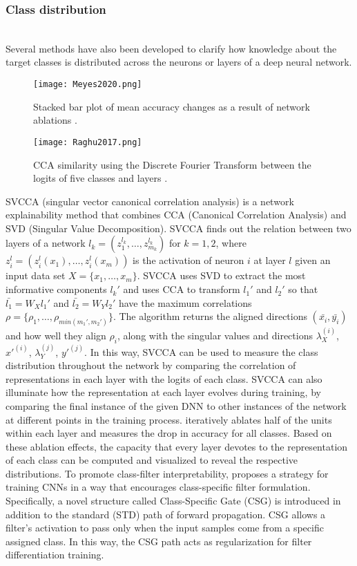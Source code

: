 \documentclass[journal]{IEEEtran}
\begin{document}
\subsubsection{Class distribution}
\hfill\\
Several methods have also been developed to clarify how knowledge about the target classes is distributed across the neurons or layers of a deep neural network.

\begin{figure}
  \texttt{[image: Meyes2020.png]}
  \caption{Stacked bar plot of mean accuracy changes as a result of network ablations \cite{Meyes2020}.}
\end{figure}

\begin{figure}
  \texttt{[image: Raghu2017.png]}
  \caption{CCA similarity using the Discrete Fourier Transform between the logits of five classes and layers \cite{Raghu2017}.}
\end{figure}

SVCCA (singular vector canonical correlation analysis) \cite{Raghu2017} is a network explainability method that combines CCA (Canonical Correlation Analysis) and SVD (Singular Value Decomposition). SVCCA finds out the relation between two layers of a network $l_k=(z_1^{l_k},…,z_{m_k}^{l_k})$ for $k = 1,2$, where $z_i^l=(z_i^l (x_1 ),…,z_i^l (x_m ))$ is the activation of neuron $i$ at layer $l$ given an input data set $X=\{x_1,…,x_m\}$. SVCCA uses SVD to extract the most informative components $l_k'$ and uses CCA to transform $l_1'$ and $l_2'$ so that $\bar{l_1}=W_X l_1'$ and $\bar{l_2}=W_Y l_2'$ have the maximum correlations $\rho=\{\rho_1,…,\rho_{min(m_1',m_2')}\}$. The algorithm returns the aligned directions $(\bar{x_i},\bar{y_i})$ and how well they align $\rho_i$, along with the singular values and directions $\lambda_X^{(i)}$, $x'^{(i)}$, $\lambda_Y^{(j)}$, $y'^{(j)}$. In this way, SVCCA can be used to measure the class distribution throughout the network by comparing the correlation of representations in each layer with the logits of each class. SVCCA can also illuminate how the representation at each layer evolves during training, by comparing the final instance of the given DNN to other instances of the network at different points in the training process.
\cite{Meyes2020} iteratively ablates half of the units within each layer and measures the drop in accuracy for all classes. Based on these ablation effects, the capacity that every layer devotes to the representation of each class can be computed and visualized to reveal the respective distributions.
To promote class-filter interpretability, \cite{Liang2020} proposes a strategy for training CNNs in a way that encourages class-specific filter formulation. Specifically, a novel structure called Class-Specific Gate (CSG) is introduced in addition to the standard (STD) path of forward propagation. CSG allows a filter's activation to pass only when the input samples come from a specific assigned class. In this way, the CSG path acts as regularization for filter differentiation training. 
\end{document}
